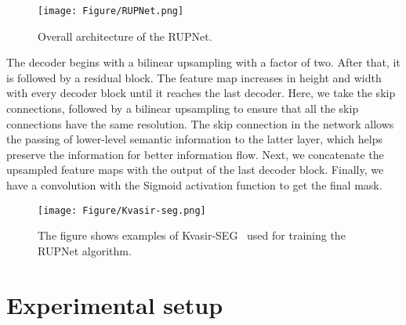\documentclass{article}
\begin{document}
\begin{figure}[!t]
    \centering
    \texttt{[image: Figure/RUPNet.png]}
    \caption{Overall architecture of the RUPNet.}
    \label{fig:rupnet}
\end{figure}
The decoder begins with a bilinear upsampling with a factor of two. After that, it is followed by a residual block. The feature map increases in height and width with every decoder block until it reaches the last decoder. Here, we take the skip connections, followed by a bilinear upsampling to ensure that all the skip connections have the same resolution. The skip connection in the network allows the passing of lower-level semantic information to the latter layer, which helps preserve the information for better information flow. Next, we concatenate the upsampled feature maps with the output of the last decoder block. Finally, we have a  convolution with the Sigmoid activation function to get the final mask.

 \begin{figure}[!t]
    \centering
    \texttt{[image: Figure/Kvasir-seg.png]}
    \caption{The figure shows examples of Kvasir-SEG~\cite{jha2020kvasir} used for training the RUPNet algorithm.}
    \label{fig:kvasir}
\end{figure}

\section{Experimental setup}
\label{sec:experimental_setup}
\end{document}
